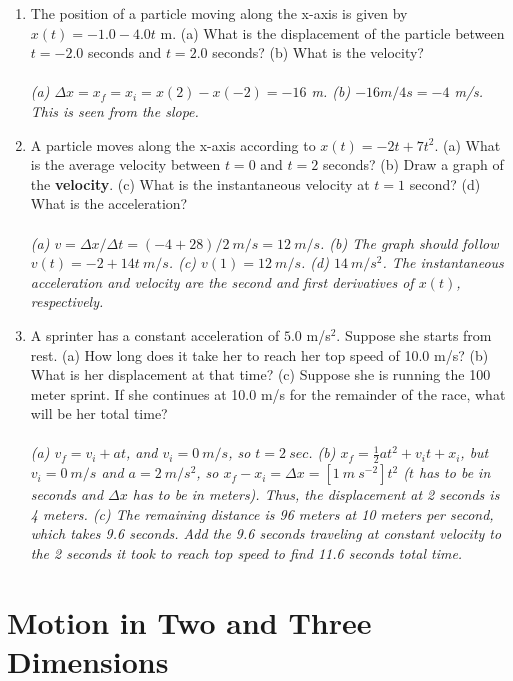 \documentclass[10pt]{article}
\begin{document}
\begin{enumerate}
\item The position of a particle moving along the x-axis is given by $x(t) = -1.0 - 4.0t$ m. (a) What is the displacement of the particle between $t=-2.0$ seconds and $t=2.0$ seconds?  (b) What is the velocity? \\ \\
\textit{(a) $\Delta x = x_f = x_i = x(2) - x(-2) = -16$ m. (b) $-16 m / 4 s = -4$ m/s.  This is seen from the slope.}
\item A particle moves along the x-axis according to $x(t) = -2t + 7t^2$.  (a) What is the average velocity between $t=0$ and $t=2$ seconds?  (b) Draw a graph of the \textbf{velocity}.  (c) What is the instantaneous velocity at $t=1$ second?  (d) What is the acceleration? \\ \\
\textit{(a) $v = \Delta x / \Delta t = (-4 + 28)/2~m/s = 12~m/s$. (b) The graph should follow $v(t) = -2+14t~m/s$. (c) $v(1) = 12~m/s$. (d) $14~m/s^2$.  The instantaneous acceleration and velocity are the second and first derivatives of $x(t)$, respectively.}
\item A sprinter has a constant acceleration of $5.0$ m/s$^2$.  Suppose she starts from rest.  (a) How long does it take her to reach her top speed of 10.0 m/s? (b) What is her displacement at that time?  (c) Suppose she is running the 100 meter sprint.  If she continues at 10.0 m/s for the remainder of the race, what will be her total time? \\ \\
\textit{(a) $v_f = v_i + a t$, and $v_i = 0~m/s$, so $t = 2~sec$. (b) $x_f = \frac{1}{2} a t^2 + v_i t + x_i$, but $v_i = 0 ~m/s$ and $a = 2~m/s^2$, so $x_f - x_i = \Delta x = [1 ~m ~s^{-2}] t^2$ ($t$ has to be in seconds and $\Delta x$ has to be in meters).  Thus, the displacement at 2 seconds is 4 meters. (c) The remaining distance is 96 meters at 10 meters per second, which takes 9.6 seconds.  Add the 9.6 seconds traveling at constant velocity to the 2 seconds it took to reach top speed to find 11.6 seconds total time.}
\end{enumerate}

\section{Motion in Two and Three Dimensions}
\end{document}
